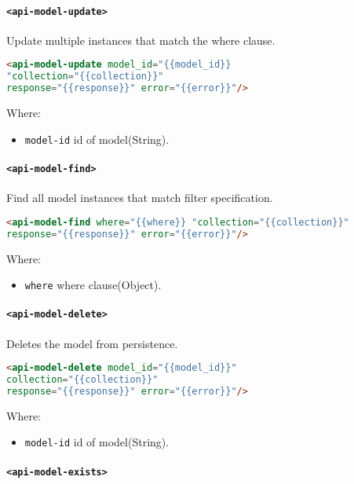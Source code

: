\paragraph{\texttt{<api-model-update>}}

Update multiple instances that match the where clause.

\begin{lstlisting}[language=html]
<api-model-update model_id="{{model_id}} 
"collection="{{collection}}" 
response="{{response}}" error="{{error}}"/>
\end{lstlisting}
Where:
\begin{itemize}
\item \texttt{model-id} id of model(String).
\end{itemize}

\paragraph{\texttt{<api-model-find>}}

Find all model instances that match filter specification.

\begin{lstlisting}[language=html]
<api-model-find where="{{where}} "collection="{{collection}}" 
response="{{response}}" error="{{error}}"/>
\end{lstlisting}
Where:
\begin{itemize}
\item \texttt{where} where clause(Object).
\end{itemize}

\paragraph{\texttt{<api-model-delete>}}

Deletes the model from persistence.

\begin{lstlisting}[language=html]
<api-model-delete model_id="{{model_id}}" 
collection="{{collection}}" 
response="{{response}}" error="{{error}}"/>
\end{lstlisting}
Where:
\begin{itemize}
\item \texttt{model-id} id of model(String).
\end{itemize}

\paragraph{\texttt{<api-model-exists>}}


